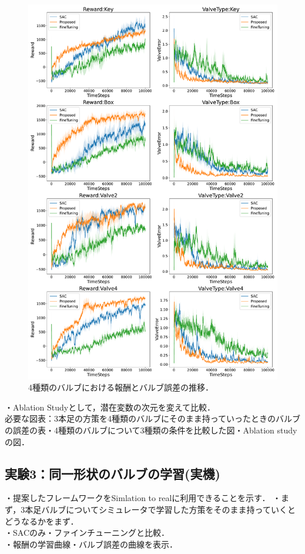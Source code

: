\documentclass[dvipdfmx]{ampbt_nomag}
\begin{document}
\begin{figure}[H]
  \centering
  \includegraphics[width=16cm]
       {asset/img/SimTurn90.pdf}
  \caption{4種類のバルブにおける報酬とバルブ誤差の推移．}
  \label{dclaw_mujoco}
\end{figure}
・Ablation Studyとして，潜在変数の次元を変えて比較．\\
必要な図表：3本足の方策を4種類のバルブにそのまま持っていったときのバルブの誤差の表・4種類のバルブについて3種類の条件を比較した図・Ablation studyの図．\\

\subsection{実験3：同一形状のバルブの学習(実機)}
・提案したフレームワークをSimlation to realに利用できることを示す．
・まず，3本足バルブについてシミュレータで学習した方策をそのまま持っていくとどうなるかをまず．\\
・SACのみ・ファインチューニングと比較．\\
・報酬の学習曲線・バルブ誤差の曲線を表示．
\end{document}
